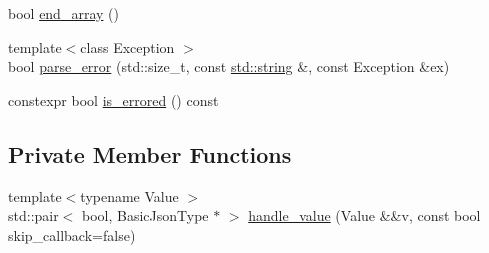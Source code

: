 \begin{DoxyCompactItemize}
\item 
bool \hyperlink{classnlohmann_1_1detail_1_1json__sax__dom__callback__parser_aa64e7a650952174037d32028de582c12}{end\+\_\+array} ()
\item 
{\footnotesize template$<$class Exception $>$ }\\bool \hyperlink{classnlohmann_1_1detail_1_1json__sax__dom__callback__parser_afb54d6937ee5d5a40e1db94422998aec}{parse\+\_\+error} (std\+::size\+\_\+t, const \hyperlink{namespacenlohmann_1_1detail_a1ed8fc6239da25abcaf681d30ace4985ab45cffe084dd3d20d928bee85e7b0f21}{std\+::string} \&, const Exception \&ex)
\item 
constexpr bool \hyperlink{classnlohmann_1_1detail_1_1json__sax__dom__callback__parser_a6c130e597672d0ee0888530f94ea7b2d}{is\+\_\+errored} () const 
\end{DoxyCompactItemize}
\subsection*{Private Member Functions}
\begin{DoxyCompactItemize}
\item 
{\footnotesize template$<$typename Value $>$ }\\std\+::pair$<$ bool, Basic\+Json\+Type $\ast$ $>$ \hyperlink{classnlohmann_1_1detail_1_1json__sax__dom__callback__parser_a875e678e20e75b37b93b80be78fe60e6}{handle\+\_\+value} (Value \&\&v, const bool skip\+\_\+callback=false)
\end{DoxyCompactItemize}
